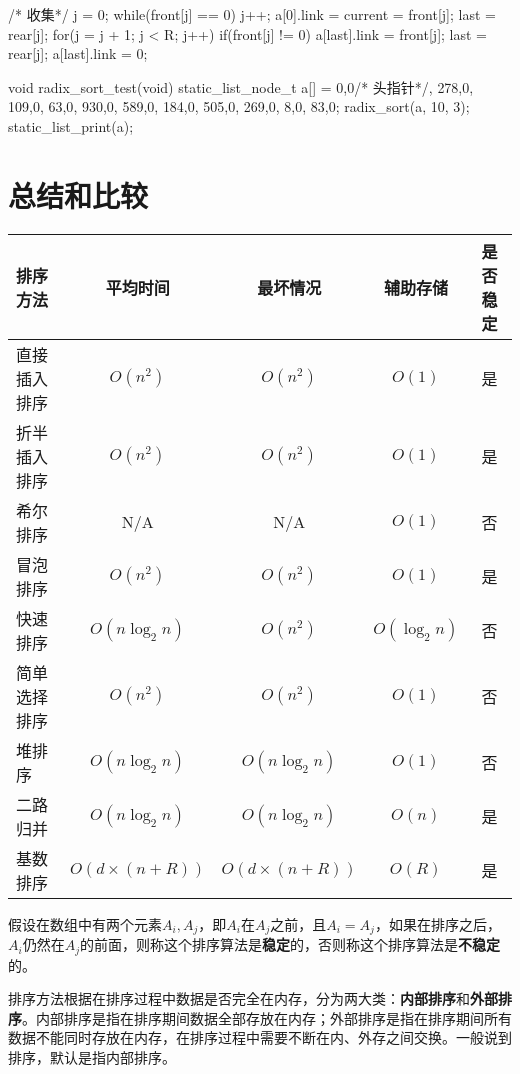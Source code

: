 \begin{Codex}[label=radix_sort.c]
{{        /* 收集*/
        j = 0;
        while(front[j] == 0) j++;
        a[0].link = current = front[j];
        last = rear[j];
        for(j = j + 1; j < R; j++) {
            if(front[j] != 0) {
                a[last].link = front[j];
                last = rear[j];
            }
        }
        a[last].link = 0;
    }
}

void radix_sort_test(void) {
    static_list_node_t a[] = {{0,0}/* 头指针*/, {278,0}, {109,0}, 
    {63,0}, {930,0}, {589,0}, {184,0}, {505,0}, {269,0}, 
    {8,0}, {83,0}};
    radix_sort(a, 10, 3);
    static_list_print(a);
}
\end{Codex}


\section{总结和比较} %

\begin{center}

\vspace{1ex}
\begin{tabular}{lcccc}
\hline
\textbf{排序方法} & \textbf{平均时间} & \textbf{最坏情况} & \textbf{辅助存储} & \textbf{是否稳定}\\
\hline
直接插入排序 & $O(n^2)$ & $O(n^2)$ & $O(1)$ & 是\\
折半插入排序 & $O(n^2)$ & $O(n^2)$ & $O(1)$ & 是\\
希尔排序 & N/A & N/A & $O(1)$ & 否\\
冒泡排序 & $O(n^2)$ & $O(n^2)$ & $O(1)$ & 是\\
快速排序 & $O(n\log_2n)$ & $O(n^2)$ & $O(\log_2n)$ & 否\\
简单选择排序 & $O(n^2)$ & $O(n^2)$ & $O(1)$ & 否\\
堆排序 & $O(n\log_2n)$ & $O(n\log_2n)$ & $O(1)$ & 否\\
二路归并 & $O(n\log_2n)$ & $O(n\log_2n)$ & $O(n)$ & 是\\
基数排序 & $O(d\times (n+R))$ & $O(d\times (n+R))$ & $O(R)$ & 是\\
\hline
\end{tabular}
\end{center}

假设在数组中有两个元素$A_i,A_j$，即$A_i$在$A_j$之前，且$A_i=A_j$，如果在排序之后，$A_i$仍然在$A_j$的前面，则称这个排序算法是\textbf{稳定}的，否则称这个排序算法是\textbf{不稳定}的。

排序方法根据在排序过程中数据是否完全在内存，分为两大类：\textbf{内部排序}和\textbf{外部排序}。内部排序是指在排序期间数据全部存放在内存；外部排序是指在排序期间所有数据不能同时存放在内存，在排序过程中需要不断在内、外存之间交换。一般说到排序，默认是指内部排序。

